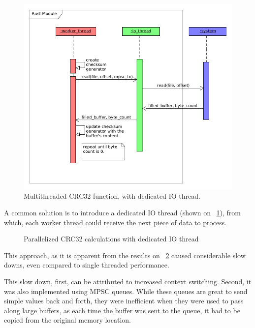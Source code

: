\begin{figure}[h]
    \centering
    \includegraphics[width=12cm]{figures/checksum/io_multi_crc}
    \caption{Multithreaded CRC32 function, with dedicated IO thread.}
    \label{fig:checksum_fig_6}
\end{figure}

A common solution is to introduce a dedicated IO thread (shown on ~\ref{fig:checksum_fig_6}), from which, each worker thread could
receive the next piece of data to process.

\begin{figure}[h]
    \centering
    \begin{bchart}[step=50,max=400, unit=s]
        \medskip
        \medskip
        \medskip
        \medskip
    \end{bchart}
    \caption{Parallelized CRC32 calculations with dedicated IO thread}
    \label{fig:checksum_fig_7}
\end{figure}


This approach, as it is apparent from the results on ~\ref{fig:checksum_fig_7} caused considerable slow downs,
even compared to single threaded performance.

This slow down, first, can be attributed to increased context switching.
Second, it was also implemented using MPSC queues.
While these queues are great to send simple values back and forth, they were inefficient
when they were used to pass along large buffers, as each time the buffer was sent to the queue,
it had to be copied from the original memory location.

